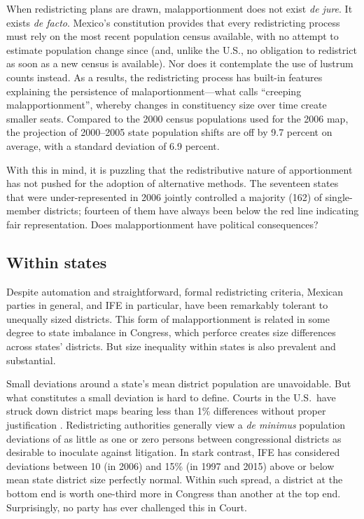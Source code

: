 \documentclass[letter,12pt]{article}
\begin{document}
When redistricting plans are drawn, malapportionment does not exist \emph{de jure}. It exists \emph{de facto}. Mexico's constitution provides that every redistricting process must rely on the most recent population census available, with no attempt to estimate population change since (and, unlike the U.S., no obligation to redistrict as soon as a new census is available). Nor does it contemplate the use of lustrum counts instead. As a results, the redistricting process has built-in features explaining the persistence of malaportionment---what \citet{johnston.2002} calls ``creeping malapportionment'', whereby changes in constituency size over time create smaller seats. Compared to the 2000 census populations used for the 2006 map, the projection of 2000--2005 state population shifts are off by 9.7 percent on average, with a standard deviation of 6.9 percent. %


With this in mind, it is puzzling that the redistributive nature of apportionment has not pushed for the adoption of alternative methods. The seventeen states that were under-represented in 2006 jointly controlled a majority (162) of single-member districts; fourteen of them have always been below the red line indicating fair representation. Does malapportionment have political consequences?

\subsection{Within states}

Despite automation and straightforward, formal redistricting criteria, Mexican parties in general, and IFE in particular, have been remarkably tolerant to unequally sized districts. This form of malapportionment is related in some degree to state imbalance in Congress, which perforce creates size differences across states' districts. But size inequality within states is also prevalent and substantial. 

Small deviations around a state's mean district population are unavoidable. But what constitutes a small deviation is hard to define. Courts in the U.S.\ have struck down district maps bearing less than 1\% differences without proper justification \citep{tuckerApportionment.1985}. Redistricting authorities generally view a \emph{de minimus} population deviations of as little as one or zero persons between congressional districts as desirable to inoculate against litigation. In stark contrast, IFE has considered deviations between 10 (in 2006) and 15\% (in 1997 and 2015) above or below mean state district size perfectly normal. Within such spread, a district at the bottom end is worth one-third more in Congress than another at the top end. Surprisingly, no party has ever challenged this in Court. 
\end{document}
